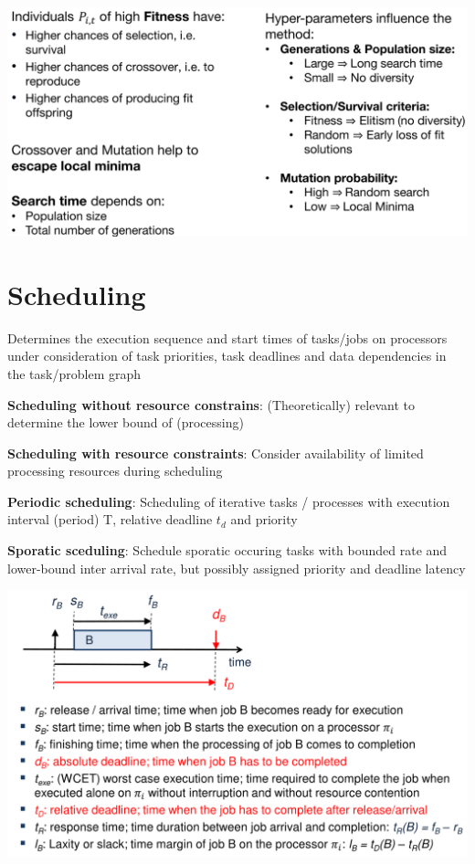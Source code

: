 \documentclass[english]{latex4ei/latex4ei_sheet}
\begin{document}
\begin{center}
  \centering
  \includegraphics[width=0.8\linewidth]{assets/GeneticCharacteristics.png}
  \label{fig:geneticcharacteristics}
\end{center}

\section{Scheduling}
Determines the execution sequence and start times of tasks/jobs on processors under consideration of task priorities, task deadlines and data dependencies in the task/problem graph

\textbf{Scheduling without resource constrains}: (Theoretically) relevant to determine the lower bound of (processing)

\textbf{Scheduling with resource constraints}: Consider availability of limited processing resources during scheduling

\textbf{Periodic scheduling}: Scheduling of iterative tasks / processes with execution interval (period) T, relative deadline $t_d$ and priority

\textbf{Sporatic sceduling}: Schedule sporatic occuring tasks with bounded rate and lower-bound inter arrival rate, but possibly assigned priority and deadline
latency


\begin{center}
  \centering
  \includegraphics[width=\linewidth]{assets/RealTimeParameters.png}
  \label{fig:realtimeparameters}
\end{center}
\end{document}
